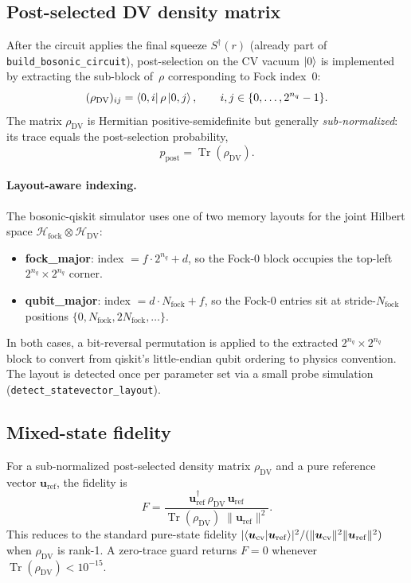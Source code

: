 \documentclass[11pt]{article}
\begin{document}
\subsection{Post-selected DV density matrix}
After the circuit applies the final squeeze $S^\dagger(r)$ (already part
of \texttt{build\_bosonic\_circuit}), post-selection on the CV vacuum
$\ket{0}$ is implemented by extracting the sub-block of~$\rho$
corresponding to Fock index~0:
\begin{equation}
(\rho_{\mathrm{DV}})_{ij}
=\bra{0,i}\rho\ket{0,j},
\qquad
i,j\in\{0,\dots,2^{n_q}-1\}.
\label{eq:postselect-dm}
\end{equation}
The matrix $\rho_{\mathrm{DV}}$ is Hermitian positive-semidefinite but generally
\emph{sub-normalized}: its trace equals the post-selection probability,
\begin{equation}
p_{\mathrm{post}}=\operatorname{Tr}(\rho_{\mathrm{DV}}).
\label{eq:post-prob-dm}
\end{equation}

\paragraph{Layout-aware indexing.}
The bosonic-qiskit simulator uses one of two memory layouts for the
joint Hilbert space $\mathcal{H}_{\mathrm{fock}}\otimes\mathcal{H}_{\mathrm{DV}}$:
\begin{itemize}
\item \textbf{fock\_major}:
  index $= f\cdot 2^{n_q} + d$, so the Fock-0 block occupies the
  top-left $2^{n_q}\times 2^{n_q}$ corner.
\item \textbf{qubit\_major}:
  index $= d\cdot N_{\mathrm{fock}} + f$, so the Fock-0 entries sit at
  stride-$N_{\mathrm{fock}}$ positions $\{0,N_{\mathrm{fock}},2N_{\mathrm{fock}},\dots\}$.
\end{itemize}
In both cases, a bit-reversal permutation is applied to the extracted
$2^{n_q}\times 2^{n_q}$ block to convert from qiskit's little-endian
qubit ordering to physics convention.
The layout is detected once per parameter set via a small probe
simulation (\texttt{detect\_statevector\_layout}).

\subsection{Mixed-state fidelity}
For a sub-normalized post-selected density matrix $\rho_{\mathrm{DV}}$ and
a pure reference vector $\bm{u}_{\mathrm{ref}}$, the fidelity is
\begin{equation}
F=\frac{\bm{u}_{\mathrm{ref}}^\dagger\,\rho_{\mathrm{DV}}\,\bm{u}_{\mathrm{ref}}}
{\operatorname{Tr}(\rho_{\mathrm{DV}})\;\|\bm{u}_{\mathrm{ref}}\|^2}.
\label{eq:fidelity-dm}
\end{equation}
This reduces to the standard pure-state fidelity
$|\!\braket{\bm{u}_{\mathrm{cv}}}{\bm{u}_{\mathrm{ref}}}\!|^2/
(\|\bm{u}_{\mathrm{cv}}\|^2\|\bm{u}_{\mathrm{ref}}\|^2)$
when $\rho_{\mathrm{DV}}$ is rank-1.
A zero-trace guard returns $F=0$ whenever
$\operatorname{Tr}(\rho_{\mathrm{DV}})<10^{-15}$.
\end{document}
